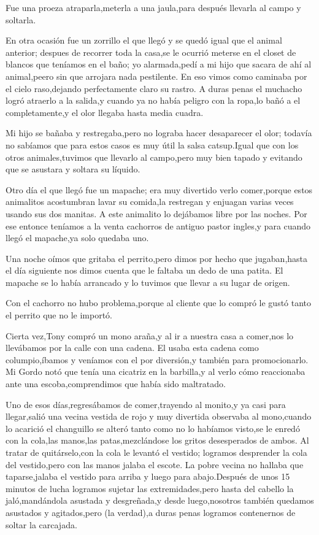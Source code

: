 \documentclass[letterpaper,12pt]{book}
\begin{document}
Fue una proeza atraparla,meterla a una jaula,para después llevarla al campo y soltarla.

En otra ocasión fue un zorrillo el que llegó y se quedó igual que el animal anterior; despues de recorrer toda la casa,se le ocurrió meterse en el closet de blancos que teníamos en el baño; yo alarmada,pedí a mi hijo que sacara de ahí al animal,peero sin que arrojara nada pestilente. En eso vimos como caminaba por el cielo raso,dejando perfectamente claro su rastro. A duras penas el muchacho logró atraerlo a la salida,y cuando ya no había peligro con la ropa,lo bañó a el completamente,y el olor llegaba hasta media cuadra.

Mi hijo se bañaba y restregaba,pero no lograba hacer desaparecer el olor; todavía no sabíamos que para estos casos es muy útil la salsa catsup.Igual que con los otros animales,tuvimos que llevarlo al campo,pero muy bien tapado y evitando que se asustara y soltara su líquido. 

Otro día el que llegó fue un mapache; era muy divertido verlo comer,porque estos animalitos acostumbran lavar su comida,la restregan y enjuagan varias veces usando sus dos manitas. A este animalito lo dejábamos libre por las noches. Por ese entonce teníamos a la venta cachorros de antiguo pastor ingles,y para cuando llegó el mapache,ya solo quedaba uno.

Una noche oímos que gritaba el perrito,pero dimos por hecho que jugaban,hasta el día siguiente nos dimos cuenta que le faltaba un dedo de una patita. El mapache se lo había arrancado y lo tuvimos que llevar a su lugar de origen.

Con el cachorro no hubo problema,porque al cliente que lo compró le gustó tanto el perrito que no le importó.

Cierta vez,Tony compró un mono araña,y al ir a nuestra casa a comer,nos lo llevábamos por la calle con una cadena. El usaba esta cadena como columpio,íbamos y veníamos con el por diversión,y también para promocionarlo. Mi Gordo notó que tenía una cicatriz en la barbilla,y al verlo cómo reaccionaba ante una escoba,comprendimos que había sido maltratado.

Uno de esos días,regresábamos de comer,trayendo al monito,y ya casi para llegar,salió una vecina vestida de rojo y muy divertida observaba al mono,cuando lo acarició el changuillo se alteró tanto como no lo habíamos visto,se le enredó con la cola,las manos,las patas,mezclándose los gritos desesperados de ambos. Al tratar de quitárselo,con la cola le levantó el vestido; logramos desprender la cola del vestido,pero con las manos jalaba el escote. La pobre vecina no hallaba que taparse,jalaba el vestido para arriba y luego para abajo.Después de unos 15 minutos de lucha logramos sujetar las extremidades,pero hasta del cabello la jaló,mandándola asustada y desgreñada,y desde luego,nosotros también quedamos asustados y agitados,pero (la verdad),a duras penas logramos contenernos de soltar la carcajada.
\end{document}
